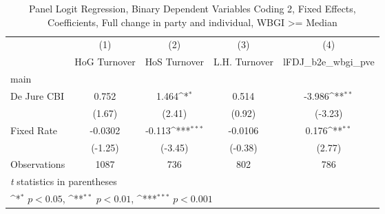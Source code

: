 \begin{table}[htbp]\centering
\def\sym#1{\ifmmode^{#1}\else\(^{#1}\)\fi}
\caption{Panel Logit Regression, Binary Dependent Variables Coding 2, Fixed Effects, Coefficients, Full change in party and individual, WBGI >= Median \label{logitFEMultInd2DJ}}
\begin{tabular}{l*{4}{c}}
\toprule
                                        &\multicolumn{1}{c}{(1)}&\multicolumn{1}{c}{(2)}&\multicolumn{1}{c}{(3)}&\multicolumn{1}{c}{(4)}\\
                                        &\multicolumn{1}{c}{HoG Turnover}&\multicolumn{1}{c}{HoS Turnover}&\multicolumn{1}{c}{L.H. Turnover}&\multicolumn{1}{c}{lFDJ\_b2e\_wbgi\_pve}\\
\midrule
main                                    &                  &                  &                  &                  \\
De Jure CBI                             &    0.752         &    1.464\sym{*}  &    0.514         &   -3.986\sym{**} \\
                                        &   (1.67)         &   (2.41)         &   (0.92)         &  (-3.23)         \\
\addlinespace
Fixed Rate                              &  -0.0302         &   -0.113\sym{***}&  -0.0106         &    0.176\sym{**} \\
                                        &  (-1.25)         &  (-3.45)         &  (-0.38)         &   (2.77)         \\
\midrule
Observations                            &     1087         &      736         &      802         &      786         \\
\bottomrule
\multicolumn{5}{l}{\footnotesize \textit{t} statistics in parentheses}\\
\multicolumn{5}{l}{\footnotesize \sym{*} \(p<0.05\), \sym{**} \(p<0.01\), \sym{***} \(p<0.001\)}\\
\end{tabular}
\end{table}

